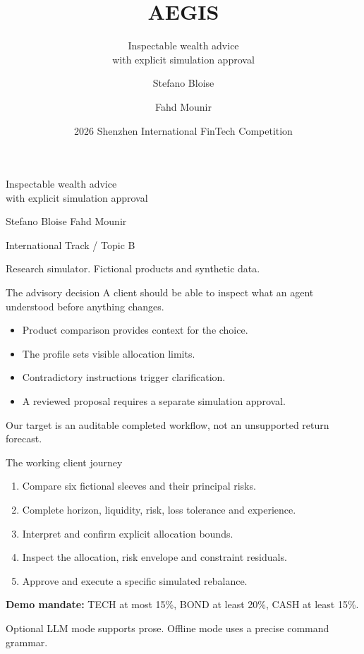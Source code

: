 \documentclass[aspectratio=169,11pt]{beamer}
\title{AEGIS}
\subtitle{Inspectable wealth advice\\with explicit simulation approval}
\author{Stefano Bloise \and Fahd Mounir}
\date{2026 Shenzhen International FinTech Competition}
\begin{document}
\begin{frame}
\vspace{10mm}{\Huge\bfseries AEGIS}\par\vspace{5mm}
{\Large Inspectable wealth advice\\with explicit simulation approval}\par\vspace{9mm}
Stefano Bloise \quad Fahd Mounir\par\vspace{3mm}
{\small International Track / Topic B}\par\vspace{7mm}
{\footnotesize Research simulator. Fictional products and synthetic data.}
\end{frame}
\begin{frame}{The advisory decision}
\Large A client should be able to inspect what an agent understood before anything changes.\par\vspace{8mm}
\normalsize
\begin{itemize}\item Product comparison provides context for the choice.
\item The profile sets visible allocation limits.
\item Contradictory instructions trigger clarification.
\item A reviewed proposal requires a separate simulation approval.\end{itemize}
\vspace{5mm}\small Our target is an auditable completed workflow, not an unsupported return forecast.
\end{frame}
\begin{frame}{The working client journey}
\begin{enumerate}
\item Compare six fictional sleeves and their principal risks.
\item Complete horizon, liquidity, risk, loss tolerance and experience.
\item Interpret and confirm explicit allocation bounds.
\item Inspect the allocation, risk envelope and constraint residuals.
\item Approve and execute a specific simulated rebalance.
\end{enumerate}
\vspace{6mm}
\textbf{Demo mandate:} TECH at most 15\%, BOND at least 20\%, CASH at least 15\%.\par
\small Optional LLM mode supports prose. Offline mode uses a precise command grammar.
\end{frame}
\end{document}
